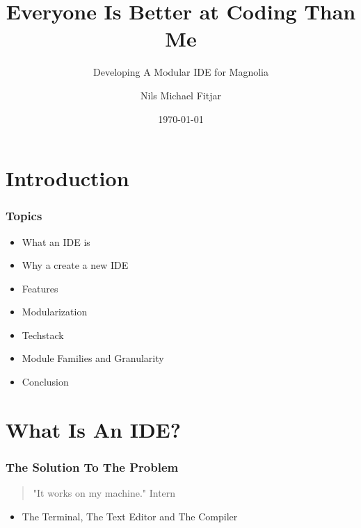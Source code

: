 \documentclass{beamer}
\title{Everyone Is Better at Coding Than Me}
\subtitle{Developing A Modular IDE for Magnolia}
\author{Nils Michael Fitjar}
\institute{University of Bergen}
\date{\today}
\begin{document}
\section{Introduction}

\begin{frame}
    \frametitle{Topics}
    \begin{itemize}
      \item What an IDE is
      \item Why a create a new IDE
      \item Features
      \item Modularization
      \item Techstack
      \item Module Families and Granularity
      \item Conclusion
    \end{itemize}
\end{frame}

\section{What Is An IDE?}
\SectionPage

\begin{frame}
  \frametitle{The Solution To The Problem}
  \begin{quote}
    "It works on my machine." \textemdash Intern
  \end{quote}
  \begin{itemize}
    \item The Terminal, The Text Editor and The Compiler
  \end{itemize}
\end{frame}
\end{document}
